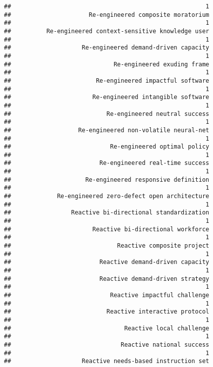 \documentclass[
]{article}
\begin{document}
\begin{verbatim}
##                                                       1 
##                      Re-engineered composite moratorium 
##                                                       1 
##          Re-engineered context-sensitive knowledge user 
##                                                       1 
##                    Re-engineered demand-driven capacity 
##                                                       1 
##                             Re-engineered exuding frame 
##                                                       1 
##                        Re-engineered impactful software 
##                                                       1 
##                       Re-engineered intangible software 
##                                                       1 
##                           Re-engineered neutral success 
##                                                       1 
##                   Re-engineered non-volatile neural-net 
##                                                       1 
##                            Re-engineered optimal policy 
##                                                       1 
##                         Re-engineered real-time success 
##                                                       1 
##                     Re-engineered responsive definition 
##                                                       1 
##             Re-engineered zero-defect open architecture 
##                                                       1 
##                 Reactive bi-directional standardization 
##                                                       1 
##                       Reactive bi-directional workforce 
##                                                       1 
##                              Reactive composite project 
##                                                       1 
##                         Reactive demand-driven capacity 
##                                                       1 
##                         Reactive demand-driven strategy 
##                                                       1 
##                            Reactive impactful challenge 
##                                                       1 
##                           Reactive interactive protocol 
##                                                       1 
##                                Reactive local challenge 
##                                                       1 
##                               Reactive national success 
##                                                       1 
##                    Reactive needs-based instruction set 

\end{verbatim}
\end{document}
